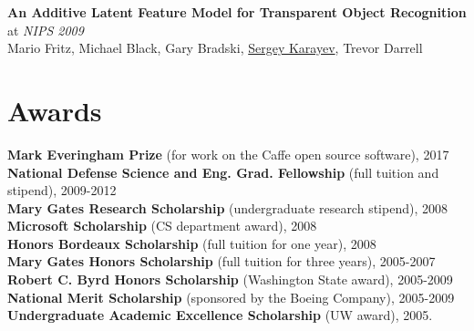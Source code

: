 \documentclass[line, margin]{res}
\begin{document}
\begin{resume}
\textbf{An Additive Latent Feature Model for Transparent Object Recognition} at \emph{NIPS 2009}\\
Mario Fritz, Michael Black, Gary Bradski, \underline{Sergey Karayev}, Trevor Darrell


\section{\sc Awards}
{\bf Mark Everingham Prize} (for work on the Caffe open source software), 2017\\
{\bf National Defense Science and Eng. Grad. Fellowship} (full tuition and stipend), 2009-2012\\
{\bf Mary Gates Research Scholarship} (undergraduate research stipend), 2008\\
{\bf Microsoft Scholarship} (CS department award), 2008\\
{\bf Honors Bordeaux Scholarship} (full tuition for one year), 2008\\
{\bf Mary Gates Honors Scholarship} (full tuition for three years), 2005-2007\\
{\bf Robert C. Byrd Honors Scholarship} (Washington State award), 2005-2009\\
{\bf National Merit Scholarship} (sponsored by the Boeing Company), 2005-2009\\
{\bf Undergraduate Academic Excellence Scholarship} (UW award), 2005.

\end{resume}
\end{document}
